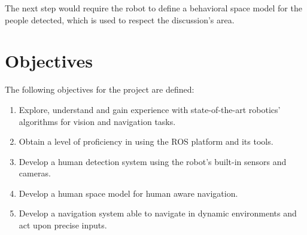The next step would require the robot to define a behavioral space model for the people detected, which is used to respect the discussion's area.

\section{Objectives}

The following objectives for the project are defined:

\begin{enumerate}
  \item Explore, understand and gain experience with state-of-the-art robotics' algorithms for vision and navigation tasks.
  \item Obtain a level of proficiency in using the ROS platform and its tools.  
  \item Develop a human detection system using the robot's built-in sensors and cameras.
  \item Develop a human space model for human aware navigation.
  \item Develop a navigation system able to navigate in dynamic environments and act upon precise inputs.
\end{enumerate}
